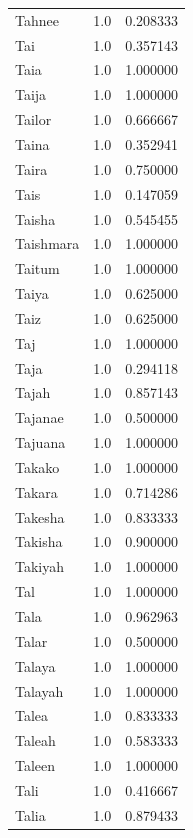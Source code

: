 \documentclass[
  letterpaper,
  DIV=11,
  numbers=noendperiod]{scrreprt}
\begin{document}
\begin{tabular}{lrr}
Tahnee          &   1.0 &   0.208333 \\
Tai             &   1.0 &   0.357143 \\
Taia            &   1.0 &   1.000000 \\
Taija           &   1.0 &   1.000000 \\
Tailor          &   1.0 &   0.666667 \\
Taina           &   1.0 &   0.352941 \\
Taira           &   1.0 &   0.750000 \\
Tais            &   1.0 &   0.147059 \\
Taisha          &   1.0 &   0.545455 \\
Taishmara       &   1.0 &   1.000000 \\
Taitum          &   1.0 &   1.000000 \\
Taiya           &   1.0 &   0.625000 \\
Taiz            &   1.0 &   0.625000 \\
Taj             &   1.0 &   1.000000 \\
Taja            &   1.0 &   0.294118 \\
Tajah           &   1.0 &   0.857143 \\
Tajanae         &   1.0 &   0.500000 \\
Tajuana         &   1.0 &   1.000000 \\
Takako          &   1.0 &   1.000000 \\
Takara          &   1.0 &   0.714286 \\
Takesha         &   1.0 &   0.833333 \\
Takisha         &   1.0 &   0.900000 \\
Takiyah         &   1.0 &   1.000000 \\
Tal             &   1.0 &   1.000000 \\
Tala            &   1.0 &   0.962963 \\
Talar           &   1.0 &   0.500000 \\
Talaya          &   1.0 &   1.000000 \\
Talayah         &   1.0 &   1.000000 \\
Talea           &   1.0 &   0.833333 \\
Taleah          &   1.0 &   0.583333 \\
Taleen          &   1.0 &   1.000000 \\
Tali            &   1.0 &   0.416667 \\
Talia           &   1.0 &   0.879433 \\

\end{tabular}
\end{document}
